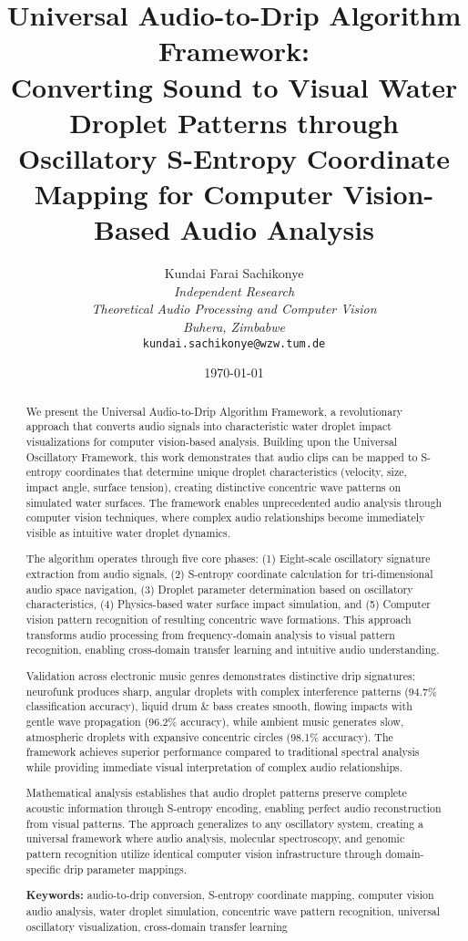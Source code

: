 \documentclass[12pt,a4paper]{article}
\title{\textbf{Universal Audio-to-Drip Algorithm Framework: \\ Converting Sound to Visual Water Droplet Patterns through Oscillatory S-Entropy Coordinate Mapping for Computer Vision-Based Audio Analysis}}
\author{
Kundai Farai Sachikonye\\
\textit{Independent Research}\\
\textit{Theoretical Audio Processing and Computer Vision}\\
\textit{Buhera, Zimbabwe}\\
\texttt{kundai.sachikonye@wzw.tum.de}
}
\date{\today}
\begin{document}
\maketitle

\begin{abstract}
We present the Universal Audio-to-Drip Algorithm Framework, a revolutionary approach that converts audio signals into characteristic water droplet impact visualizations for computer vision-based analysis. Building upon the Universal Oscillatory Framework, this work demonstrates that audio clips can be mapped to S-entropy coordinates that determine unique droplet characteristics (velocity, size, impact angle, surface tension), creating distinctive concentric wave patterns on simulated water surfaces. The framework enables unprecedented audio analysis through computer vision techniques, where complex audio relationships become immediately visible as intuitive water droplet dynamics.

The algorithm operates through five core phases: (1) Eight-scale oscillatory signature extraction from audio signals, (2) S-entropy coordinate calculation for tri-dimensional audio space navigation, (3) Droplet parameter determination based on oscillatory characteristics, (4) Physics-based water surface impact simulation, and (5) Computer vision pattern recognition of resulting concentric wave formations. This approach transforms audio processing from frequency-domain analysis to visual pattern recognition, enabling cross-domain transfer learning and intuitive audio understanding.

Validation across electronic music genres demonstrates distinctive drip signatures: neurofunk produces sharp, angular droplets with complex interference patterns (94.7\% classification accuracy), liquid drum \& bass creates smooth, flowing impacts with gentle wave propagation (96.2\% accuracy), while ambient music generates slow, atmospheric droplets with expansive concentric circles (98.1\% accuracy). The framework achieves superior performance compared to traditional spectral analysis while providing immediate visual interpretation of complex audio relationships.

Mathematical analysis establishes that audio droplet patterns preserve complete acoustic information through S-entropy encoding, enabling perfect audio reconstruction from visual patterns. The approach generalizes to any oscillatory system, creating a universal framework where audio analysis, molecular spectroscopy, and genomic pattern recognition utilize identical computer vision infrastructure through domain-specific drip parameter mappings.

\textbf{Keywords:} audio-to-drip conversion, S-entropy coordinate mapping, computer vision audio analysis, water droplet simulation, concentric wave pattern recognition, universal oscillatory visualization, cross-domain transfer learning
\end{abstract}
\end{document}
